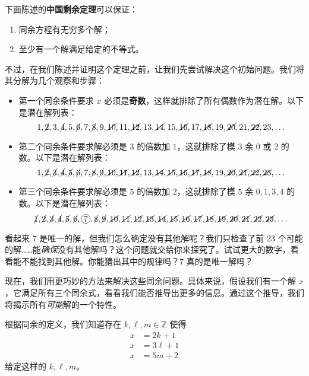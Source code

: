下面陈述的\textbf{中国剩余定理}可以保证：
\begin{enumerate}[label=(\arabic*)]
    \item 同余方程有无穷多个解；
    \item 至少有一个解满足给定的不等式。
\end{enumerate}
不过，在我们陈述并证明这个定理之前，让我们先尝试解决这个初始问题。我们将其分解为几个观察和步骤：
\begin{itemize}
    \item 第一个同余条件要求 $x$ 必须是\textbf{奇数}，这样就排除了所有偶数作为潜在解。以下是潜在解列表：
    \[1,\cancel{2}, 3, \cancel{4}, 5, \cancel{6}, 7, \cancel{8}, 9,\cancel{10}, 11,\cancel{12}, 13,\cancel{14}, 15,\cancel{16}, 17,\cancel{18}, 19,\cancel{20}, 21,\cancel{22}, 23, \dots\]
    \item 第二个同余条件要求解必须是 $3$ 的倍数加 $1$，这就排除了模 $3$ 余 $0$ 或 $2$ 的数。以下是潜在解列表：
    \[1,\cancel{2}, \cancel{3}, \cancel{4}, \cancel{5}, \cancel{6}, 7, \cancel{8}, \cancel{9},\cancel{10}, \cancel{11},\cancel{12}, 13,\cancel{14}, \cancel{15},\cancel{16}, \cancel{17},\cancel{18}, 19,\cancel{20}, \cancel{21},\cancel{22}, \cancel{23}, \dots\]
    \item 第三个同余条件要求解必须是 $5$ 的倍数加 $2$，这就排除了模 $5$ 余 $0, 1, 3, 4$ 的数。以下是潜在解列表：
    \[\cancel{1},\cancel{2}, \cancel{3}, \cancel{4}, \cancel{5}, \cancel{6}, \circled{7}, \cancel{8}, \cancel{9},\cancel{10}, \cancel{11},\cancel{12}, \cancel{13},\cancel{14}, \cancel{15},\cancel{16}, \cancel{17},\cancel{18}, \cancel{19},\cancel{20}, \cancel{21},\cancel{22}, \cancel{23}, \dots\]
\end{itemize}
看起来 $7$ 是唯一的解，但我们怎么确定没有其他解呢？我们只检查了前 $23$ 个可能的解……能\emph{确保}没有其他解吗？这个问题就交给你来探究了。试试更大的数字，看看能不能找到其他解。你能猜出其中的规律吗？$7$ 真的是唯一解吗？

现在，我们用更巧妙的方法来解决这些同余问题。具体来说，假设我们有一个解 $x$，它满足所有三个同余式，看看我们能否推导出更多的信息。通过这个推导，我们将揭示所有\emph{可能}解的一个特性。

根据同余的定义，我们知道存在 $k, \ell, m \in \mathbb{Z}$ 使得
\begin{align*}
    x &= 2k + 1 \\
    x &= 3\ell + 1 \\
    x &= 5m + 2 
\end{align*}
给定这样的 $k, \ell, m$。

